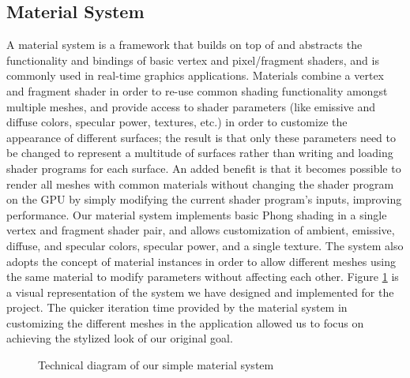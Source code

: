\documentclass[a4paper,twoside]{article}
\begin{document}
\subsection{Material System}
\label{sec:mat_sys}
\noindent A material system is a framework that builds on top of and abstracts the functionality and bindings of basic vertex and pixel/fragment shaders, and is commonly used in real-time graphics applications. Materials combine a vertex and fragment shader in order to re-use common shading functionality amongst multiple meshes, and provide access to shader parameters (like emissive and diffuse colors, specular power, textures, etc.) in order to customize the appearance of different surfaces; the result is that only these parameters need to be changed to represent a multitude of surfaces rather than writing and loading shader programs for each surface. An added benefit is that it becomes possible to render all meshes with common materials without changing the shader program on the GPU by simply modifying the current shader program's inputs, improving performance. Our material system implements basic Phong shading in a single vertex and fragment shader pair, and allows customization of ambient, emissive, diffuse, and specular colors, specular power, and a single texture. The system also adopts the concept of material instances in order to allow different meshes using the same material to modify parameters without affecting each other. Figure \ref{fig_ms} is a visual representation of the system we have designed and implemented for the project. The quicker iteration time provided by the material system in customizing the different meshes in the application allowed us to focus on achieving the stylized look of our original goal.

\begin{figure}
\caption{Technical diagram of our simple material system}
\label{fig_ms}
\end{figure}
\end{document}

